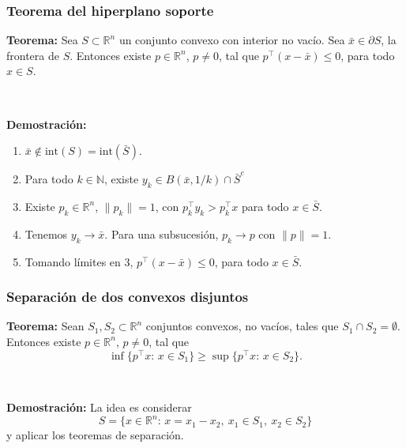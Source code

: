 \documentclass{beamer}
\begin{document}
\begin{frame}
\frametitle{Teorema del hiperplano soporte}

{\bf Teorema:} Sea $S\subset\mathbb{R}^n$ un conjunto convexo con interior no vacío. Sea $\bar{x}\in \partial S$, la frontera de $S$. Entonces existe $p\in\mathbb{R}^n$, $p\neq 0$, tal que $p^\top (x-\bar{x})\leq 0$, para todo $x\in S$.

\

{\scriptsize
\textbf{Demostración:} 

\begin{enumerate}
\item $\bar{x}\notin \mbox{int}(S)=\mbox{int}(\bar{S})$.

\item Para todo $k\in\mathbb{N}$, existe $y_k\in B(\bar{x}, 1/k) \cap \bar{S}^c$

\item Existe $p_k\in\mathbb{R}^n$, $\|p_k\|=1$, con $p^\top_k y_k > p_k^\top x$ para todo $x\in \bar{S}$.

\item Tenemos $y_k\to \bar{x}$. Para una subsucesión, $p_k\to p$ con $\|p\|=1$.

\item Tomando límites en 3, $p^\top (x-\bar{x})\leq 0$, para todo $x\in \bar{S}$.

\end{enumerate}
}
\end{frame}
\begin{frame}
\frametitle{Separación de dos convexos disjuntos}

{\bf Teorema:} Sean $S_1,S_2\subset\mathbb{R}^n$ conjuntos convexos, no vacíos, tales que $S_1\cap S_2=\emptyset$.  Entonces existe $p\in\mathbb{R}^n$, $p\neq 0$, tal que
\[
\inf\{p^\top x:\, x\in S_1\} \geq \sup \{p^\top x:\, x\in S_2\}.
\]

\

{\bf Demostración:} La idea es considerar
\[
S = \{x\in \mathbb{R}^n:\, x = x_1-x_2,\ x_1\in S_1,\ x_2\in S_2\}
\]
y aplicar los teoremas de separación.

\end{frame}
\end{document}
